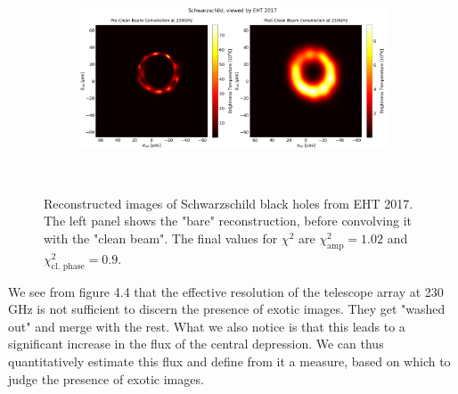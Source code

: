 \documentclass[12pt]{article}
\numberwithin{equation}{section}
\numberwithin{figure}{section}
\begin{document}
	\begin{figure}[h!]
		\centering
		\begin{subfigure}{12cm}
			\hspace{-1.5cm}
			\includegraphics[scale = 0.23]{Section_8_Observing_Horizonless_Objects/Ehtim_plot_2017_no_blur_Sch.png}
		\end{subfigure}\\
		\label{Kerr_EHT_2017}
		\caption[Reconstructed images of Schwarzschild black holes from EHT 2017.]{\small Reconstructed images of Schwarzschild black holes from EHT 2017. The left panel shows the "bare" reconstruction, before convolving it with the "clean beam". The final values for $\chi^2$ are $\chi^2_\text{amp} = 1.02$ and $\chi^2_\text{cl. phase} = 0.9$.} 
	\end{figure}
	
	We see from figure 4.4 that the effective resolution of the telescope array at 230 GHz is not sufficient to discern the presence of exotic images. They get "washed out" and merge with the rest. What we also notice is that this leads to a significant increase in the flux of the central depression. We can thus quantitatively estimate this flux and define from it a measure, based on which to judge the presence of exotic images.
	
\end{document}
